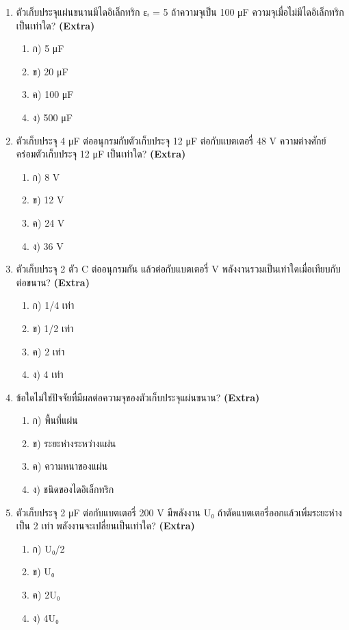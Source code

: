 \documentclass[12pt]{article}
\begin{document}
\begin{enumerate}[label=\arabic*.]
\begin{enumerate}[label=)]
\item ก) 5.4×10⁻⁴ C
\item ข) 4.2×10⁻⁴ C
\item ค) 3×10⁻⁴ C
\item ง) 2.4×10⁻⁴ C
\end{enumerate}
\item ตัวเก็บประจุแผ่นขนานมีไดอิเล็กทริก εᵣ = 5 ถ้าความจุเป็น 100 μF ความจุเมื่อไม่มีไดอิเล็กทริกเป็นเท่าใด? \hfill \textbf{\small (Extra)}
\begin{enumerate}[label=)]
\item ก) 5 μF
\item ข) 20 μF
\item ค) 100 μF
\item ง) 500 μF
\end{enumerate}
\item ตัวเก็บประจุ 4 μF ต่ออนุกรมกับตัวเก็บประจุ 12 μF ต่อกับแบตเตอรี่ 48 V ความต่างศักย์คร่อมตัวเก็บประจุ 12 μF เป็นเท่าใด? \hfill \textbf{\small (Extra)}
\begin{enumerate}[label=)]
\item ก) 8 V
\item ข) 12 V
\item ค) 24 V
\item ง) 36 V
\end{enumerate}
\item ตัวเก็บประจุ 2 ตัว C ต่ออนุกรมกัน แล้วต่อกับแบตเตอรี่ V พลังงานรวมเป็นเท่าใดเมื่อเทียบกับต่อขนาน? \hfill \textbf{\small (Extra)}
\begin{enumerate}[label=)]
\item ก) 1/4 เท่า
\item ข) 1/2 เท่า
\item ค) 2 เท่า
\item ง) 4 เท่า
\end{enumerate}
\item ข้อใดไม่ใช่ปัจจัยที่มีผลต่อความจุของตัวเก็บประจุแผ่นขนาน? \hfill \textbf{\small (Extra)}
\begin{enumerate}[label=)]
\item ก) พื้นที่แผ่น
\item ข) ระยะห่างระหว่างแผ่น
\item ค) ความหนาของแผ่น
\item ง) ชนิดของไดอิเล็กทริก
\end{enumerate}
\item ตัวเก็บประจุ 2 μF ต่อกับแบตเตอรี่ 200 V มีพลังงาน U₀ ถ้าตัดแบตเตอรี่ออกแล้วเพิ่มระยะห่างเป็น 2 เท่า พลังงานจะเปลี่ยนเป็นเท่าใด? \hfill \textbf{\small (Extra)}
\begin{enumerate}[label=)]
\item ก) U₀/2
\item ข) U₀
\item ค) 2U₀
\item ง) 4U₀
\end{enumerate}
\end{enumerate}
\end{document}
